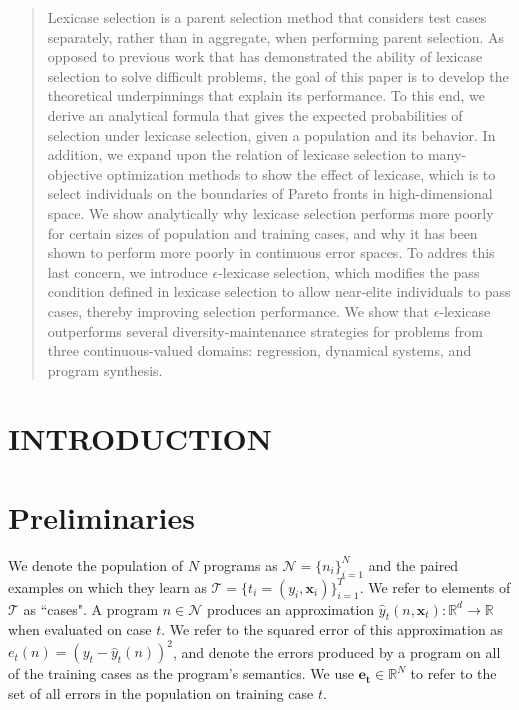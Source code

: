 \documentclass[preprint]{article}
\begin{document}
\maketitle
\begin{abstract}
Lexicase selection is a parent selection method that considers test cases separately, rather than in aggregate, when performing parent selection. As opposed to previous work that has demonstrated the ability of lexicase selection to solve difficult problems, the goal of this paper is to develop the theoretical underpinnings that explain its performance. To this end, we derive an analytical formula that gives the expected probabilities of selection under lexicase selection, given a population and its behavior. In addition, we expand upon the relation of lexicase selection to many-objective optimization methods to show the effect of lexicase, which is to select individuals on the boundaries of Pareto fronts in high-dimensional space. We show analytically why lexicase selection performs more poorly for certain sizes of population and training cases, and why it has been shown to perform more poorly in continuous error spaces. To addres this last concern, we introduce $\epsilon$-lexicase selection, which modifies the pass condition defined in lexicase selection to allow near-elite individuals to pass cases, thereby improving selection performance. We show that $\epsilon$-lexicase outperforms several diversity-maintenance strategies for problems from three continuous-valued domains: regression, dynamical systems, and program synthesis.
\end{abstract}


\section{INTRODUCTION}
  


\section{Preliminaries}
We denote the population of $N$ programs as $\mathcal{N} = \{n_i\}_{i=1}^N$ and the paired examples on which they learn as $\mathcal{T} = \{t_i = (y_i,\mathbf{x}_i)\}_{i=1}^T$. We refer to elements of $\mathcal{T}$ as ``cases". A program $n \in \mathcal{N}$ produces an approximation $\hat{y}_t(n,\mathbf{x}_t): \mathbb{R}^d \rightarrow \mathbb{R}$ when evaluated on case $t$. We refer to the squared error of this approximation as $e_t(n) = (y_t - \hat{y}_t(n))^2$, and denote the errors produced by a program on all of the training cases as the program's semantics. We use $\mathbf{e_t} \in \mathbb{R}^N$ to refer to the set of all errors in the population on training case $t$. 
\end{document}
